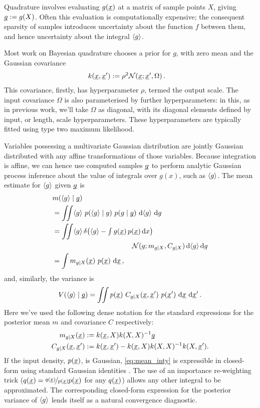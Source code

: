 \documentclass[twoside]{article}
\begin{document}
Quadrature involves evaluating $g(\underline{\smash{x}})$ at a matrix of sample points $X$, giving $\underline{\smash{g}}:= g(X)$. Often this evaluation is computationally expensive; the consequent sparsity of samples introduces uncertainty about the function $f$ between them, and hence uncertainty about the integral $\langle g \rangle$.

Most work on Bayesian quadrature chooses a \gp prior for $g$, with zero mean and the Gaussian covariance 
\begin{align} \label{eq:Gaussian_cov_fn}
k(\underline{\smash{x}},\underline{\smash{x}}') & := \rho^2 \mathcal{N}(\underline{\smash{x}};\underline{\smash{x}}',\Omega)\,.
\end{align} 
This covariance, firstly, has hyperparameter $\rho$, 
termed the output scale. The input covariance $\Omega$ is also parameterised by further hyperparameters: in this, as in previous work, we'll take $\Omega$ as diagonal, with its diagonal elements defined by input, or length, scale hyperparameters.  These hyperparameters are typically fitted using type two maximum likelihood.

Variables possessing a multivariate Gaussian distribution are jointly Gaussian distributed with any affine transformations of those variables. Because integration is affine, we can hence use computed samples $\underline{\smash{g}}$ to perform analytic Gaussian process inference about the value of integrals over $g(x)$, such as $\langle g \rangle$. The mean estimate for $\langle g \rangle$ given $\underline{\smash{g}}$ is
%
\begin{align} 
&
\mean{\inty{g}}{\v{g}} 
\nonumber\\
& =\iint \inty{g}~\p{\inty{g}}{g}~\p{g}{\v{g}}~\ud \inty{g}~\ud g                                                                                                                                                               \nonumber\\
&
 =\iint \inty{g}\,\delta\bigl(\inty{g} - {\textstyle\int g(\vx)\,p(\vx)\,\ud x}\bigr)
\nonumber\\
& \hspace{4cm}
\N{g}{m_{g|X}}{C_{g|X}}\,\ud \inty{g} \,\ud g 
\nonumber\\
&
 = \int m_{g|X}(\vx)~p(\vx)~\ud \vx
\,, \label{eq:mean_inty}
\end{align}
and, similarly, the variance is
\begin{align} 
V(\langle g \rangle\mid\underline{\smash{g}})
=\iint p(\underline{\smash{x}})~C_{g|X}(\underline{\smash{x}}, \underline{\smash{x}}')~p(\underline{\smash{x}}')~\mathrm{d} \underline{\smash{x}}~\mathrm{d} \underline{\smash{x}}'
\,. \label{eq:var_inty}
\end{align}
Here we've used the following dense notation for the standard \gp expressions for the posterior mean $m$ and covariance $C$ respectively:
\begin{align}
m_{g|X}(\underline{\smash{x}})& := k(\underline{\smash{x}}, X) k(X, X)^{-1} \underline{\smash{g}}\\
C_{g|X}(\underline{\smash{x}}, \underline{\smash{x}}')& := k(\underline{\smash{x}}, \underline{\smash{x}}') - k(\underline{\smash{x}}, X) k(X, X)^{-1} k(X, \underline{\smash{x}}').
\end{align}
If the input density, $p(\underline{\smash{x}})$, is Gaussian, \eqref{eq:mean_inty} is expressible in closed-form using standard Gaussian identities \citep{BZMonteCarlo}.
The use of an importance re-weighting trick ($q(\underline{\smash{x}}) = \nicefrac{q(\underline{\smash{x}})}{p(\underline{\smash{x}})} p(\underline{\smash{x}})$ for any $q(\underline{\smash{x}})$) allows any other integral to be approximated. 
%
The corresponding closed-form expression for the posterior variance of $\langle g \rangle$ lends itself as a natural convergence diagnostic. 
\end{document}
